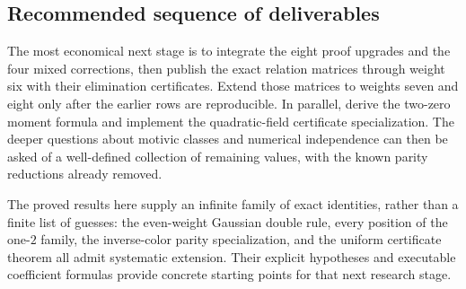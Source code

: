 \subsection{Recommended sequence of deliverables}

The most economical next stage is to integrate the eight proof
upgrades and the four mixed corrections, then publish the exact
relation matrices through weight six with their elimination
certificates. Extend those matrices to weights seven and eight
only after the earlier rows are reproducible. In parallel, derive
the two-zero moment formula and implement the quadratic-field
certificate specialization. The deeper questions about motivic
classes and numerical independence can then be asked of a
well-defined collection of remaining values, with the known
parity reductions already removed.

The proved results here supply an infinite family of exact
identities, rather than a finite list of guesses: the even-weight
Gaussian double rule, every position of the one-$2$ family, the
inverse-color parity specialization, and the uniform certificate
theorem all admit systematic extension. Their explicit hypotheses
and executable coefficient formulas provide concrete starting
points for that next research stage.
